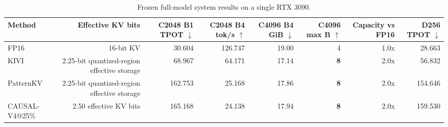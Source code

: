 \begin{table}[t]
\centering
\small
\caption{Frozen full-model system results on a single RTX 3090.}
\label{tab:system-main}
\begin{tabular}{lrrrrrrr}
\toprule
Method & Effective KV bits & C2048 B1 TPOT $\downarrow$ & C2048 B4 tok/s $\uparrow$ & C4096 B4 GiB $\downarrow$ & C4096 max B $\uparrow$ & Capacity vs FP16 & D256 TPOT $\downarrow$ \\
\midrule
FP16 & 16-bit KV & 30.604 & 126.747 & 19.00 & 4 & 1.0x & 28.663 \\
KIVI & 2.25-bit quantized-region effective storage & 68.967 & 64.171 & 17.14 & \textbf{8} & 2.0x & 56.832 \\
PatternKV & 2.25-bit quantized-region effective storage & 162.753 & 25.168 & 17.86 & \textbf{8} & 2.0x & 154.646 \\
CAUSAL-V4@25\% & ~2.50 effective KV bits & 165.168 & 24.138 & 17.94 & \textbf{8} & 2.0x & 159.530 \\
\bottomrule
\end{tabular}
\end{table}
